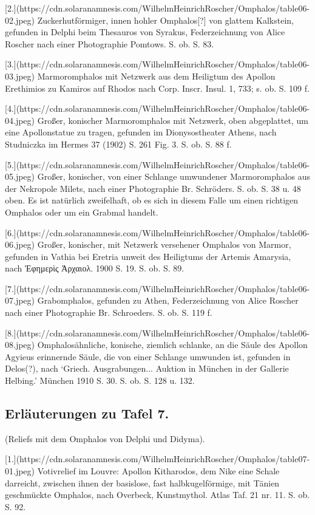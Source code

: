 \documentclass[a4paper, 11pt, oneside]{article}
\begin{document}
[2.](https://cdn.solaranamnesis.com/WilhelmHeinrichRoscher/Omphalos/table06-02.jpeg) Zuckerhutförmiger, innen hohler Omphalos[?] von glattem Kalkstein, gefunden in Delphi beim Thesauros von Syrakus, Federzeichnung von Alice Roscher nach einer Photographie Pomtows. S. ob. S. 83.

[3.](https://cdn.solaranamnesis.com/WilhelmHeinrichRoscher/Omphalos/table06-03.jpeg) Marmoromphalos mit Netzwerk aus dem Heiligtum des Apollon Erethimios zu Kamiros auf Rhodos nach Corp. Inscr. Insul. 1, 733; s. ob. S. 109 f.

[4.](https://cdn.solaranamnesis.com/WilhelmHeinrichRoscher/Omphalos/table06-04.jpeg) Großer, konischer Marmoromphalos mit Netzwerk, oben abgeplattet, um eine Apollonstatue zu tragen, gefunden im Dionysostheater Athens, nach Studniczka im Hermes 37 (1902) S. 261 Fig. 3. S. ob. S. 88 f.

[5.](https://cdn.solaranamnesis.com/WilhelmHeinrichRoscher/Omphalos/table06-05.jpeg) Großer, konischer, von einer Schlange umwundener Marmoromphalos aus der Nekropole Milets, nach einer Photographie Br. Schröders. S. ob. S. 38 u. 48 oben. Es ist natürlich zweifelhaft, ob es sich in diesem Falle um einen richtigen Omphalos oder um ein Grabmal handelt.

[6.](https://cdn.solaranamnesis.com/WilhelmHeinrichRoscher/Omphalos/table06-06.jpeg) Großer, konischer, mit Netzwerk versehener Omphalos von Marmor, gefunden in Vathia bei Eretria unweit des Heiligtums der Artemis Amarysia, nach Ἐφημερὶς Ἀρχαιολ. 1900 S. 19. S. ob. S. 89.

[7.](https://cdn.solaranamnesis.com/WilhelmHeinrichRoscher/Omphalos/table06-07.jpeg) Grabomphalos, gefunden zu Athen, Federzeichnung von Alice Roscher nach einer Photographie Br. Schroeders. S. ob. S. 119 f.

[8.](https://cdn.solaranamnesis.com/WilhelmHeinrichRoscher/Omphalos/table06-08.jpeg) Omphalosähnliche, konische, ziemlich schlanke, an die Säule des Apollon Agyieus erinnernde Säule, die von einer Schlange umwunden ist, gefunden in Delos(?), nach `Griech. Ausgrabungen... Auktion in München in der Gallerie Helbing.' München 1910 S. 30. S. ob. S. 128 u. 132.
\clearpage
\subsection{Erläuterungen zu Tafel 7.}

(Reliefs mit dem Omphalos von Delphi und Didyma).

[1.](https://cdn.solaranamnesis.com/WilhelmHeinrichRoscher/Omphalos/table07-01.jpeg) Votivrelief im Louvre: Apollon Kitharodos, dem Nike eine Schale darreicht, zwischen ihnen der basislose, fast halbkugelförmige, mit Tänien geschmückte Omphalos, nach Overbeck, Kunstmythol. Atlas Taf. 21 nr. 11. S. ob. S. 92.
\end{document}
